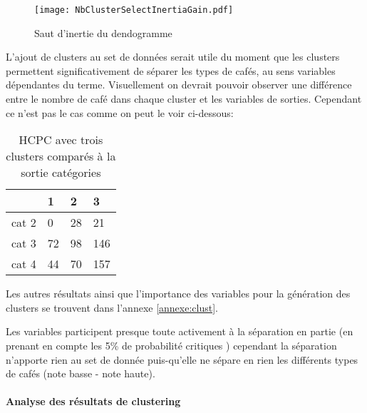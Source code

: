 
\begin{figure}[H]
	\texttt{[image: NbClusterSelectInertiaGain.pdf]}
	\caption{\label{HCT_Inert} Saut d'inertie du dendogramme  }
\end{figure}






\noindent L'ajout de clusters au set de données serait utile du moment que les clusters permettent significativement de séparer les types de cafés, au sens variables dépendantes du terme. Visuellement on devrait pouvoir observer une différence entre le nombre de café dans chaque cluster et les variables de sorties. Cependant ce n'est pas le cas comme on peut le voir ci-dessous: 


\begin{table}[H]
	\centering
	\label{cluster3category}
	\begin{tabular}{llll}
		 & 1  & 2  & 3   \\
		 \hline
		cat 2            & 0  & 28 & 21  \\
		cat 3            & 72 & 98 & 146 \\
		cat 4            & 44 & 70 & 157 
	\end{tabular}
	\caption{HCPC avec trois clusters comparés à la sortie catégories}
\end{table}


\noindent Les autres résultats ainsi que l'importance des variables pour la génération des clusters se trouvent dans l'annexe \ref{annexe:clust}.


\noindent Les variables participent presque toute activement à la séparation en partie (en prenant en compte les 5\% de probabilité critiques ) cependant la séparation n'apporte rien au set de donnée puis-qu'elle ne sépare en rien les différents types de cafés (note basse - note haute).



\paragraph{Analyse des résultats de clustering}























